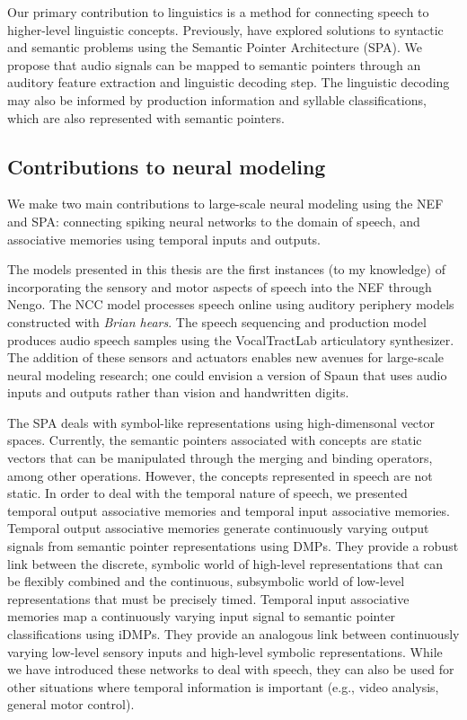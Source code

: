 Our primary contribution to linguistics
is a method for connecting speech
to higher-level linguistic concepts.
Previously, \citet{blouw2013,blouw2015,stewart2015}
have explored solutions to
syntactic and semantic problems
using the Semantic Pointer Architecture (SPA).
We propose that audio signals
can be mapped to semantic pointers
through an auditory feature extraction
and linguistic decoding step.
The linguistic decoding may also be informed
by production information
and syllable classifications,
which are also represented with semantic pointers.

\subsection{Contributions to neural modeling}

We make two main contributions to
large-scale neural modeling using the NEF and SPA:
connecting spiking neural networks
to the domain of speech,
and associative memories using
temporal inputs and outputs.

The models presented in this thesis
are the first instances (to my knowledge)
of incorporating the sensory and motor
aspects of speech into the NEF
through Nengo.
The NCC model processes speech online
using auditory periphery models
constructed with \textit{Brian hears}.
The speech sequencing and production model
produces audio speech samples
using the VocalTractLab articulatory synthesizer.
The addition of these sensors and actuators
enables new avenues
for large-scale neural modeling research;
one could envision a version of Spaun
that uses audio inputs and outputs
rather than vision and handwritten digits.

The SPA deals with symbol-like representations
using high-dimensonal vector spaces.
Currently, the semantic pointers
associated with concepts are
static vectors that can be manipulated
through the merging and binding operators,
among other operations.
However, the concepts represented in speech
are not static.
In order to deal with the temporal nature of speech,
we presented temporal output associative memories
and temporal input associative memories.
Temporal output associative memories
generate continuously varying output signals
from semantic pointer representations
using DMPs.
They provide a robust link between the discrete,
symbolic world of high-level representations
that can be flexibly combined
and the continuous, subsymbolic world
of low-level representations that must
be precisely timed.
Temporal input associative memories
map a continuously varying input signal
to semantic pointer classifications
using iDMPs.
They provide an analogous link between
continuously varying low-level sensory inputs
and high-level symbolic representations.
While we have introduced these networks
to deal with speech,
they can also be used for other
situations where temporal information
is important (e.g., video analysis,
general motor control).

